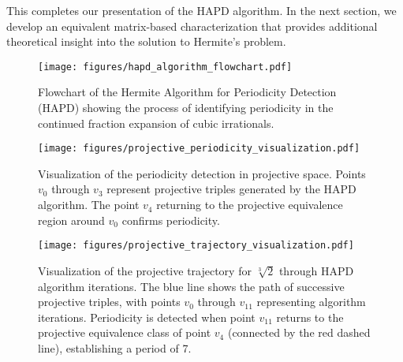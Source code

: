This completes our presentation of the HAPD algorithm. In the next section, we develop an equivalent matrix-based characterization that provides additional theoretical insight into the solution to Hermite's problem.

\begin{figure}[ht]
\centering
\texttt{[image: figures/hapd\_algorithm\_flowchart.pdf]}
\caption{Flowchart of the Hermite Algorithm for Periodicity Detection (HAPD) showing the process of identifying periodicity in the continued fraction expansion of cubic irrationals.}
\label{fig:hapd_flowchart}
\end{figure}

\begin{figure}[ht]
\centering
\texttt{[image: figures/projective\_periodicity\_visualization.pdf]}
\caption{Visualization of the periodicity detection in projective space. Points $v_0$ through $v_3$ represent projective triples generated by the HAPD algorithm. The point $v_4$ returning to the projective equivalence region around $v_0$ confirms periodicity.}
\label{fig:projective_visualization}
\end{figure}

\begin{figure}[ht]
\centering
\texttt{[image: figures/projective\_trajectory\_visualization.pdf]}
\caption{Visualization of the projective trajectory for $\sqrt[3]{2}$ through HAPD algorithm iterations. The blue line shows the path of successive projective triples, with points $v_0$ through $v_{11}$ representing algorithm iterations. Periodicity is detected when point $v_{11}$ returns to the projective equivalence class of point $v_4$ (connected by the red dashed line), establishing a period of 7.}
\label{fig:projective_trajectory}
\end{figure}
